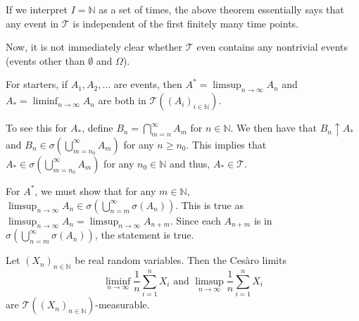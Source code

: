 If we interpret $I=\mathbb{N}$ as a set of times, the above theorem essentially says that any event in $\mathcal{T}$ is independent of the first finitely many time points.

\vspace{2mm}
Now, it is not immediately clear whether $\mathcal{T}$ even contains any nontrivial events (events other than $\emptyset$ and $\Omega$).

\vspace{2mm}
For starters, if $A_1,A_2,\ldots$ are events, then $A^*=\limsup_{n\to\infty} A_n$ and $A_*=\liminf_{n\to\infty} A_n$ are both in $\mathcal{T}((A_i)_{i\in \mathbb{N}})$.

\vspace{1mm}
To see this for $A_*$, define $B_n=\bigcap_{m=n}^\infty A_m$ for $n\in\mathbb{N}$. We then have that $B_n\uparrow A_*$ and $B_n\in\sigma(\bigcup_{m=n_0}^\infty A_m)$ for any $n\geq n_0$. This implies that $A_*\in\sigma(\bigcup_{m=n_0}^\infty A_m)$ for any $n_0\in\mathbb{N}$ and thus, $A_*\in\mathcal{T}$.

\vspace{1mm}
For $A^*$, we must show that for any $m\in\mathbb{N}$, $\limsup_{n\to\infty}A_n \in \sigma(\bigcup_{n=m}^\infty \sigma(A_n))$. This is true as $\limsup_{n\to\infty}A_n=\limsup_{n\to\infty}A_{n+m}$. Since each $A_{n+m}$ is in $\sigma(\bigcup_{n=m}^\infty \sigma(A_{n}))$, the statement is true.

\vspace{2mm}
Let $(X_n)_{n\in\mathbb{N}}$ be real random variables. Then the Ces\`{a}ro limits
$$\liminf_{n\to\infty} \frac{1}{n}\sum_{i=1}^n X_i\text{ and }\limsup_{n\to\infty} \frac{1}{n}\sum_{i=1}^n X_i$$
are $\mathcal{T}((X_n)_{n\in\mathbb{N}})$-measurable.


